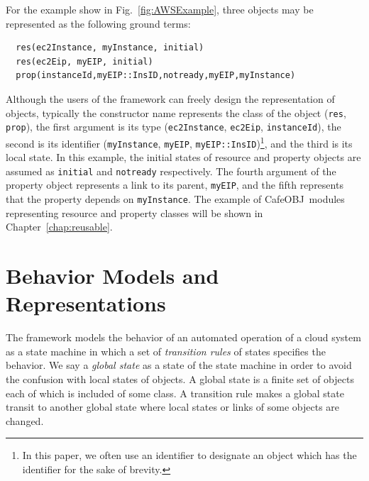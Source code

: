\documentclass[12pt]{report}
\newcommand{\cafeobj}{{\sf CafeOBJ}~}
\begin{document}
For the example show in Fig.~\ref{fig:AWSExample}, three objects may
be represented as the following ground terms:
\small
\begin{verbatim}
  res(ec2Instance, myInstance, initial)
  res(ec2Eip, myEIP, initial)
  prop(instanceId,myEIP::InsID,notready,myEIP,myInstance)
\end{verbatim}
\normalsize
Although the users of the framework can freely design the
representation of objects, typically the constructor name represents
the class of the object ({\tt res}, {\tt prop}), the first argument is
its type ({\tt ec2Instance}, {\tt ec2Eip}, {\tt instanceId}), the
second is its identifier ({\tt myInstance}, {\tt myEIP},
{\tt myEIP::InsID})\footnote{In this paper, we often use an identifier
  to designate an object which has the identifier for the sake of
  brevity.}, and the third is its local state. In this example, the
initial states of resource and property objects are assumed as
{\tt initial} and {\tt notready} respectively. The fourth argument of the
property object represents a link to its parent, {\tt myEIP}, and the
fifth represents that the property depends on {\tt myInstance}. The
example of \cafeobj modules representing resource and property classes
will be shown in Chapter~\ref{chap:reusable}.

\section{Behavior Models and Representations}
\label{sec:behaviormodel}
The framework models the behavior of an automated operation of a cloud
system as a state machine in which a set of {\it transition rules} of
states specifies the behavior. We say a {\it global state} as a state
of the state machine in order to avoid the confusion with local states
of objects. A global state is a finite set of objects each of which is
included of some class. A transition rule makes a global state transit
to another global state where local states or links of some objects
are changed.
\end{document}
